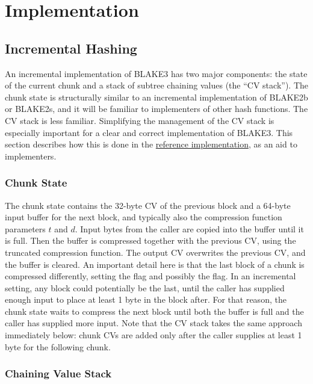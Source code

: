 \documentclass[11pt,notitlepage,a4paper]{article}
\newcommand{\flag}[1]{\texttt{\detokenize{#1}}\xspace}
\begin{document}
\section{Implementation}\label{sec:implementation}

\subsection{Incremental Hashing}\label{sec:incremental}

An incremental implementation of BLAKE3 has two major components: the state of
the current chunk and a stack of subtree chaining values (the ``CV stack'').
The chunk state is structurally similar to an incremental implementation of
BLAKE2b or BLAKE2s, and it will be familiar to implementers of other hash
functions. The CV stack is less familiar. Simplifying the management of the CV
stack is especially important for a clear and correct implementation of BLAKE3.
This section describes how this is done in the
\href{https://github.com/BLAKE3-team/BLAKE3/blob/master/reference_impl/reference_impl.rs}{reference
implementation}, as an aid to implementers.

\subsubsection{Chunk State}\label{sec:chunkstate}

The chunk state contains the 32-byte CV of the previous block and a 64-byte
input buffer for the next block, and typically also the compression function
parameters $t$ and $d$. Input bytes from the caller are copied into the buffer
until it is full. Then the buffer is compressed together with the previous CV,
using the truncated compression function. The output CV overwrites the previous
CV, and the buffer is cleared. An important detail here is that the last block
of a chunk is compressed differently, setting the \flag{CHUNK_END} flag and
possibly the \flag{ROOT} flag. In an incremental setting, any block could
potentially be the last, until the caller has supplied enough input to place at
least 1 byte in the block after. For that reason, the chunk state waits to
compress the next block until both the buffer is full and the caller has
supplied more input. Note that the CV stack takes the same approach immediately
below: chunk CVs are added only after the caller supplies at least 1 byte for
the following chunk.

\subsubsection{Chaining Value Stack}\label{sec:cvstack}
\end{document}

